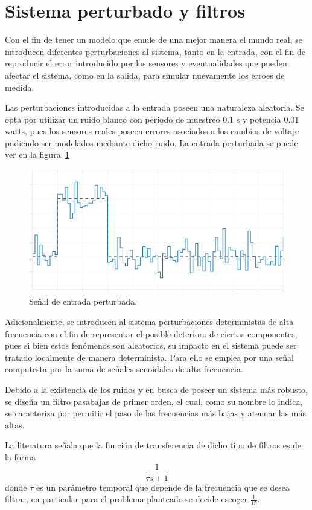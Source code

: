 \section{Sistema perturbado y filtros}
Con el fin de tener un modelo que emule de una mejor manera el mundo real,
se introducen diferentes perturbaciones al sistema, tanto en la
entrada, con el fin de reproducir el error introducido por los sensores
y eventualidades que pueden afectar el sistema, como en la salida, para simular nuevamente los erroes de medida.

Las perturbaciones introducidas a la entrada poseen una naturaleza aleatoria. Se opta por utilizar un ruido blanco con periodo de
muestreo $0.1$ s y potencia $0.01$ watts, pues los sensores reales poseen errores
asociados a los cambios de voltaje pudiendo ser modelados mediante dicho ruido.
La entrada perturbada se puede ver en la figura~\ref{fig:entrada-ruido}

\begin{figure}[t]
  \label{fig:entrada-ruido}
  \includegraphics[scale=0.15]{Figuras/entrada}
  \caption{Señal de entrada perturbada.} 
\end{figure}

Adicionalmente, se introducen al sistema perturbaciones deterministas
de alta frecuencia con el fin de representar el posible deterioro de ciertas
componentes, pues si bien estos fenómenos son aleatorios, su impacto en el sistema
puede ser tratado localmente de manera determinista. Para ello se emplea por una señal computesta por la suma de señales senoidales de alta frecuencia.

Debido a la existencia de los ruidos y en busca de poseer un sistema más robusto, se diseña un filtro pasabajas de primer orden,
el cual, como su nombre lo indica, se caracteriza por permitir el paso de las frecuencias
más bajas y atenuar las más altas.

La literatura señala que la función de transferencia de dicho tipo de filtros
es de la forma~\cite{9780750300582}
\[
\frac{1}{\tau s + 1}
\]
donde $\tau $ es un parámetro temporal que depende de la frecuencia que se desea
filtrar, en particular para el problema planteado se decide escoger $\frac{1}{15}$.

